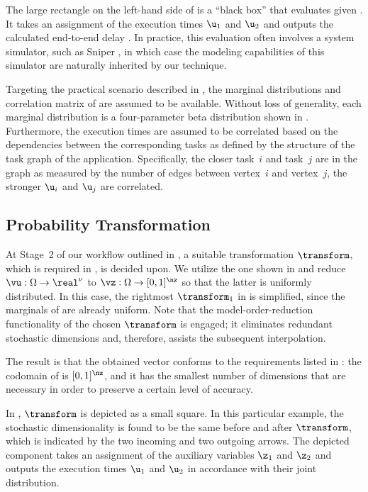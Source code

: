 The large rectangle on the left-hand side of  is a
``black box'' that evaluates \g given \vu. It takes an assignment of the
execution times $\u_1$ and $\u_2$ and outputs the calculated end-to-end delay
\g. In practice, this evaluation often involves a system simulator, such as
Sniper \cite{carlson2011}, in which case the modeling capabilities of this
simulator are naturally inherited by our technique.

Targeting the practical scenario described in , the
marginal distributions and correlation matrix of \vu are assumed to be
available. Without loss of generality, each marginal distribution is a
four-parameter beta distribution shown in . Furthermore,
the execution times are assumed to be correlated based on the dependencies
between the corresponding tasks as defined by the structure of the task graph of
the application. Specifically, the closer task~$i$ and task~$j$ are in the graph
as measured by the number of edges between vertex~$i$ and vertex~$j$, the
stronger $\u_i$ and $\u_j$ are correlated.

\subsection{Probability Transformation}

At Stage~2 of our workflow outlined in , a suitable
transformation $\transform$, which is required in ,
is decided upon. We utilize the one shown in 
and reduce $\vu: \Omega \to \real^\nu$ to $\vz: \Omega \to [0, 1]^\nz$ so that
the latter is uniformly distributed. In this case, the rightmost $\transform_1$
in  is simplified, since the marginals of \vz
are already uniform. Note that the model-order-reduction functionality of the
chosen $\transform$ is engaged; it eliminates redundant stochastic dimensions
and, therefore, assists the subsequent interpolation.

The result is that the obtained vector \vz conforms to the requirements listed
in : the codomain of \vz is $[0, 1]^\nz$, and it has
the smallest number of dimensions that are necessary in order to preserve a
certain level of accuracy.

In , $\transform$ is depicted as a small square. In this
particular example, the stochastic dimensionality is found to be the same before
and after $\transform$, which is indicated by the two incoming and two outgoing
arrows. The depicted component takes an assignment of the auxiliary variables
$\z_1$ and $\z_2$ and outputs the execution times $\u_1$ and $\u_2$ in
accordance with their joint distribution.

